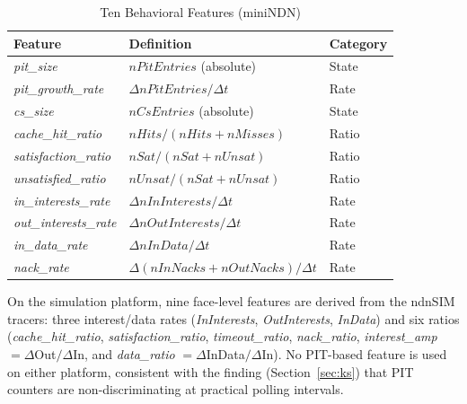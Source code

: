 \documentclass[12pt]{report}
\begin{document}
\begin{table}[H]
\centering
\caption{Ten Behavioral Features (miniNDN)}
\label{tab:features}
\begin{tabular}{@{}lll@{}}
\toprule
\textbf{Feature}              & \textbf{Definition}                                                       & \textbf{Category} \\
\midrule
\textit{pit\_size}            & $\textit{nPitEntries}$ (absolute)                                         & State \\
\textit{pit\_growth\_rate}    & $\Delta\textit{nPitEntries} / \Delta t$                                   & Rate  \\
\textit{cs\_size}             & $\textit{nCsEntries}$ (absolute)                                          & State \\
\textit{cache\_hit\_ratio}    & $\textit{nHits} / (\textit{nHits} + \textit{nMisses})$                    & Ratio \\
\textit{satisfaction\_ratio}  & $\textit{nSat} / (\textit{nSat} + \textit{nUnsat})$                       & Ratio \\
\textit{unsatisfied\_ratio}   & $\textit{nUnsat} / (\textit{nSat} + \textit{nUnsat})$                     & Ratio \\
\textit{in\_interests\_rate}  & $\Delta\textit{nInInterests} / \Delta t$                                  & Rate  \\
\textit{out\_interests\_rate} & $\Delta\textit{nOutInterests} / \Delta t$                                 & Rate  \\
\textit{in\_data\_rate}       & $\Delta\textit{nInData} / \Delta t$                                       & Rate  \\
\textit{nack\_rate}           & $\Delta(\textit{nInNacks} + \textit{nOutNacks}) / \Delta t$               & Rate  \\
\bottomrule
\end{tabular}
\end{table}

On the simulation platform, nine face-level features are derived from the ndnSIM tracers: three interest/data rates (\textit{InInterests}, \textit{OutInterests}, \textit{InData}) and six ratios (\textit{cache\_hit\_ratio}, \textit{satisfaction\_ratio}, \textit{timeout\_ratio}, \textit{nack\_ratio}, \textit{interest\_amp} $=\Delta$Out$/\Delta$In, and \textit{data\_ratio} $=\Delta$InData$/\Delta$In). No PIT-based feature is used on either platform, consistent with the finding (Section~\ref{sec:ks}) that PIT counters are non-discriminating at practical polling intervals.
\end{document}
